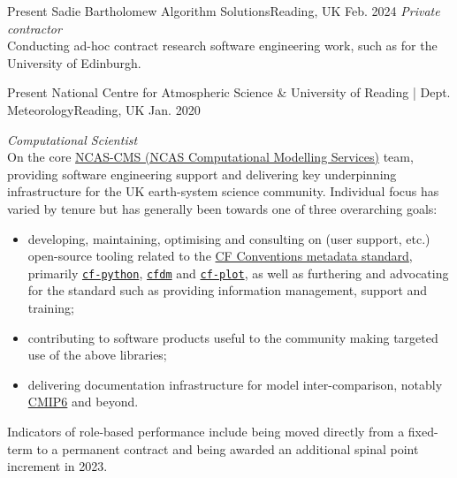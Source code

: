 
\begin{experiences}

 \researchexperience
    {Present} {Sadie Bartholomew Algorithm Solutions}{Reading, UK}{}
    {Feb. 2024} {\textit{Private contractor}\\
    Conducting ad-hoc contract research software engineering work, such as for the University of Edinburgh.
    }
    
\emptySeparator
\researchexperience
    {Present} {National Centre for Atmospheric Science \& University of Reading | Dept. Meteorology}{Reading, UK}{}
    {Jan. 2020} {\textit{Computational Scientist}\\
    On the core \href{https://cms.ncas.ac.uk/index.html}{NCAS-CMS (NCAS Computational Modelling Services)} team, providing software engineering support and delivering key underpinning infrastructure for the UK earth-system science community. Individual focus has varied by tenure but has generally been towards one of three overarching goals:
    \begin{itemize}
        \itemsep0em 
        \item developing, maintaining, optimising and consulting on (user support, etc.) open-source tooling related to the \href{https://cfconventions.org/}{CF Conventions metadata standard}, primarily \href{https://github.com/NCAS-CMS/cf-python}{\texttt{cf-python}}, \href{https://github.com/NCAS-CMS/cfdm}{\texttt{cfdm}} and \href{https://github.com/NCAS-CMS/cf-plot}{\texttt{cf-plot}}, as well as furthering and advocating for the standard such as providing information management, support and training;
        \item contributing to software products useful to the community making targeted use of the above libraries;
        \item delivering documentation infrastructure for model inter-comparison, notably \href{https://wcrp-cmip.org/cmip6/}{CMIP6} and beyond.
    \end{itemize}
    Indicators of role-based performance include being moved directly from a fixed-term to a permanent contract and being awarded an additional spinal point increment in 2023.
    \vskip 0.1cm
    }


\end{experiences}
